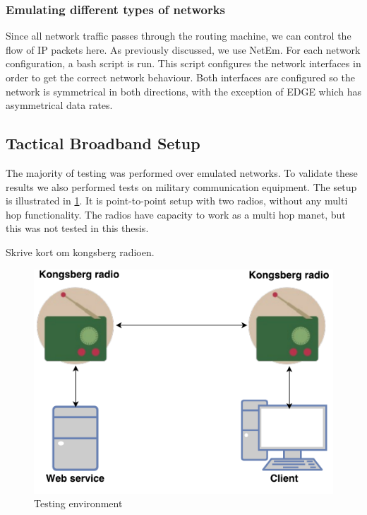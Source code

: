 \subsubsection{Emulating different types of networks}

Since all network traffic passes through the routing machine, we can control the
flow of IP packets here. As previously discussed, we use NetEm.  For each
network configuration, a bash script is run. This script configures the network
interfaces in order to get the correct network behaviour. Both interfaces are
configured so the network is symmetrical in both directions, with the exception
of EDGE which has asymmetrical data rates.

\subsection{Tactical Broadband Setup}

The majority of testing was performed over emulated networks. To validate these
results we also performed tests on military communication equipment. The setup
is illustrated in \cref{figure-radio-testing-environment}. It is point-to-point
setup with two radios, without any multi hop functionality. The radios have
capacity to work as a multi hop \gls{manet}, but this was not tested in this
thesis.

Skrive kort om kongsberg radioen.

\begin{figure}[h]
\centering
\includegraphics[scale=0.6]{images/radio_testing_environment.pdf}
\caption{Testing environment}
\label{figure-radio-testing-environment}
\end{figure}

